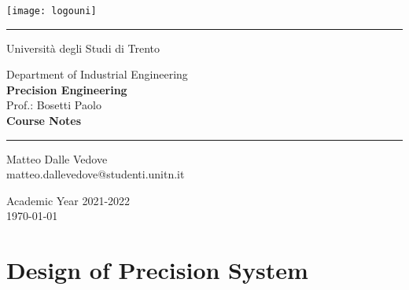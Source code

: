 \documentclass[10 pt,letterpaper,twoside,openright]{book}
\begin{document}
	
	\frontmatter
	
	\begin{center}
		\vspace{3cm}
		\thispagestyle{empty}
		\texttt{[image: logouni]}
		
		\vspace{1cm}
		\rule{5cm}{0.5pt}
		\vspace{1cm}		
		
		{\Large Università degli Studi di Trento}
		
		\vspace{2cm}
		{\Large Department of Industrial Engineering} \\ \vspace{2mm}
		{\LARGE \textbf{Precision Engineering}} \\ \vspace{2mm}
		{\Large Prof.: Bosetti Paolo}\\
		
		\vspace{2cm}
		{\LARGE \textbf{Course Notes}}
		
		\vspace{1cm}
		\rule{5cm}{0.5pt}
		\vspace{1cm}	
		
		{\large 
			Matteo Dalle Vedove \\
			\makeatletter
			matteo.dallevedove@studenti.unitn.it
			
			\vspace{2cm}
			Academic Year 2021-2022 \\ \today}
	\end{center}
	
	\tableofcontents
	
	\mainmatter	
	
	\part{Design of Precision System}
	
	
	
\end{document}
